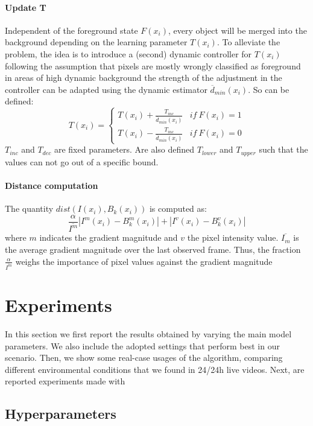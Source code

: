 \paragraph{Update T}
Independent of the foreground state $F(x_i)$, every object will be merged into the background depending on the learning parameter
$T(x_i)$. To alleviate the problem, the idea is to introduce a
(second) dynamic controller for $T(x_i)$ following the assumption that pixels are mostly wrongly classified as foreground in areas of high dynamic background the strength of the adjustment in the controller can be adapted using the dynamic estimator $\overline{d}_{min}(x_i)$. So can be defined:
\begin{equation}
T(x_i)=\begin{cases} T(x_i)+\frac{T_{inc}}{\overline{d}_{min}(x_i)} &if \ F(x_i)=1 \\ T(x_i)-\frac{T_{inc}}{\overline{d}_{min}(x_i)} &if \ F(x_i)=0 \end{cases}
\end{equation}
$T_{inc}$ and $T_{dec}$ are fixed parameters. Are also defined $T_{lower}$ and $T_{upper}$ such that the values can not go out of a specific bound.
\paragraph{Distance computation}
The quantity $ dist(I(x_i),B_k(x_i)) $ is computed as:
\begin{equation} \label{eq:dist}
\frac{\alpha}{\overline{I^m}}|I^m(x_i) - B_k^m(x_i)| + |I^v(x_i) - B_k^v(x_i)|
\end{equation}
where $m$ indicates the gradient magnitude and $v$ the pixel intensity value. $\overline{I_m}$ is the average gradient magnitude over the last observed frame. Thus, the fraction $\frac{\alpha}{\overline{I^m}}$ weighs the importance
of pixel values against the gradient magnitude

\section*{Experiments}

In this section we first report the results obtained by varying the main model parameters. We also include the adopted settings that perform best in our scenario. Then, we show some real-case usages of the algorithm, comparing different environmental conditions that we found in 24/24h live videos. Next, are reported experiments made with 

\subsection{Hyperparameters}

